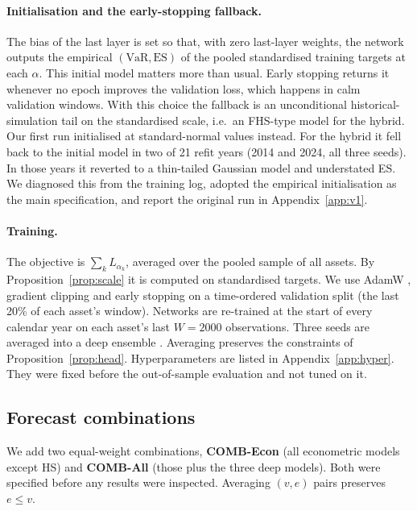 \documentclass[11pt]{article}
\theoremstyle{remark}
\newcommand{\1}{\mathbf{1}}
\newcommand{\VaR}{\mathrm{VaR}}
\newcommand{\ES}{\mathrm{ES}}
\begin{document}
\paragraph{Initialisation and the early-stopping fallback.} The bias of the last layer is set so that, with zero last-layer weights, the network outputs the empirical $(\VaR,\ES)$ of the pooled standardised training targets at each $\alpha$. This initial model matters more than usual. Early stopping returns it whenever no epoch improves the validation loss, which happens in calm validation windows. With this choice the fallback is an unconditional historical-simulation tail on the standardised scale, i.e.\ an FHS-type model for the hybrid. Our first run initialised at standard-normal values instead. For the hybrid it fell back to the initial model in two of 21 refit years (2014 and 2024, all three seeds). In those years it reverted to a thin-tailed Gaussian model and understated ES. We diagnosed this from the training log, adopted the empirical initialisation as the main specification, and report the original run in Appendix~\ref{app:v1}.

\paragraph{Training.} The objective is $\sum_kL_{\alpha_k}$, averaged over the pooled sample of all assets. By Proposition~\ref{prop:scale} it is computed on standardised targets. We use AdamW \citep{loshchilov2019decoupled}, gradient clipping and early stopping on a time-ordered validation split (the last 20\% of each asset's window). Networks are re-trained at the start of every calendar year on each asset's last $W=2000$ observations. Three seeds are averaged into a deep ensemble \citep{lakshminarayanan2017simple}. Averaging preserves the constraints of Proposition~\ref{prop:head}. Hyperparameters are listed in Appendix~\ref{app:hyper}. They were fixed before the out-of-sample evaluation and not tuned on it.

\subsection{Forecast combinations}
We add two equal-weight combinations, \textbf{COMB-Econ} (all econometric models except HS) and \textbf{COMB-All} (those plus the three deep models). Both were specified before any results were inspected. Averaging $(v,e)$ pairs preserves $e\le v$.

\end{document}
